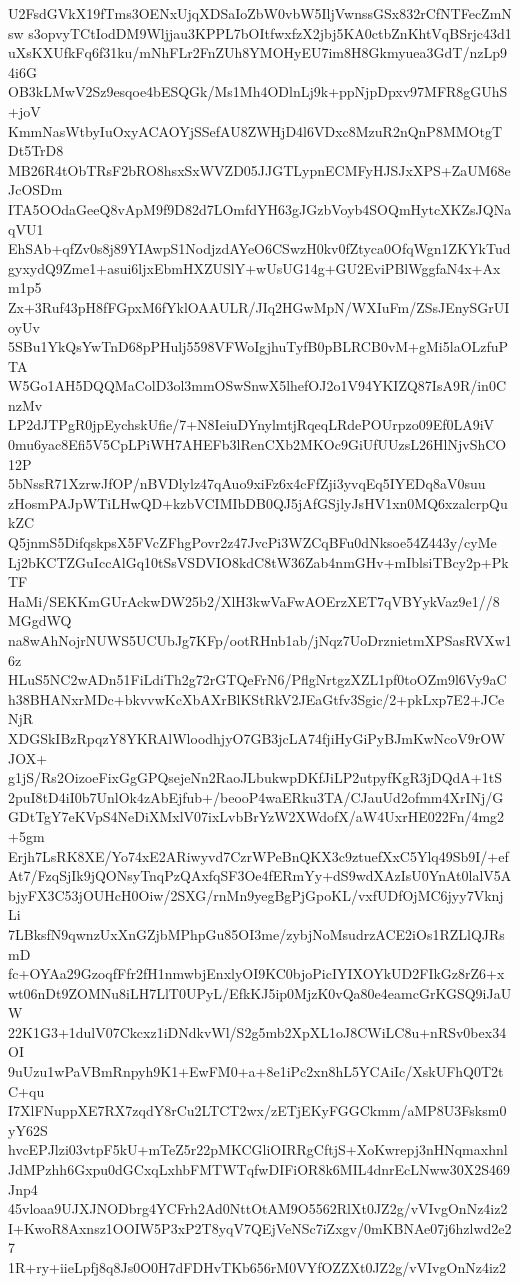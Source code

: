 U2FsdGVkX19fTms3OENxUjqXDSaIoZbW0vbW5IljVwnssGSx832rCfNTFecZmNsw
s3opvyTCtIodDM9Wljjau3KPPL7bOItfwxfzX2jbj5KA0ctbZnKhtVqBSrjc43d1
uXsKXUfkFq6f31ku/mNhFLr2FnZUh8YMOHyEU7im8H8Gkmyuea3GdT/nzLp94i6G
OB3kLMwV2Sz9esqoe4bESQGk/Ms1Mh4ODlnLj9k+ppNjpDpxv97MFR8gGUhS+joV
KmmNasWtbyIuOxyACAOYjSSefAU8ZWHjD4l6VDxc8MzuR2nQnP8MMOtgTDt5TrD8
MB26R4tObTRsF2bRO8hsxSxWVZD05JJGTLypnECMFyHJSJxXPS+ZaUM68eJcOSDm
ITA5OOdaGeeQ8vApM9f9D82d7LOmfdYH63gJGzbVoyb4SOQmHytcXKZsJQNaqVU1
EhSAb+qfZv0s8j89YIAwpS1NodjzdAYeO6CSwzH0kv0fZtyca0OfqWgn1ZKYkTud
gyxydQ9Zme1+asui6ljxEbmHXZUSlY+wUsUG14g+GU2EviPBlWggfaN4x+Axm1p5
Zx+3Ruf43pH8fFGpxM6fYklOAAULR/JIq2HGwMpN/WXIuFm/ZSsJEnySGrUIoyUv
5SBu1YkQsYwTnD68pPHulj5598VFWoIgjhuTyfB0pBLRCB0vM+gMi5laOLzfuPTA
W5Go1AH5DQQMaColD3ol3mmOSwSnwX5lhefOJ2o1V94YKIZQ87IsA9R/in0CnzMv
LP2dJTPgR0jpEychskUfie/7+N8IeiuDYnylmtjRqeqLRdePOUrpzo09Ef0LA9iV
0mu6yac8Efi5V5CpLPiWH7AHEFb3lRenCXb2MKOc9GiUfUUzsL26HlNjvShCO12P
5bNssR71XzrwJfOP/nBVDlylz47qAuo9xiFz6x4cFfZji3yvqEq5IYEDq8aV0suu
zHosmPAJpWTiLHwQD+kzbVCIMIbDB0QJ5jAfGSjlyJsHV1xn0MQ6xzalcrpQukZC
Q5jnmS5DifqskpsX5FVcZFhgPovr2z47JvcPi3WZCqBFu0dNksoe54Z443y/cyMe
Lj2bKCTZGuIccAlGq10tSsVSDVIO8kdC8tW36Zab4nmGHv+mIblsiTBcy2p+PkTF
HaMi/SEKKmGUrAckwDW25b2/XlH3kwVaFwAOErzXET7qVBYykVaz9e1//8MGgdWQ
na8wAhNojrNUWS5UCUbJg7KFp/ootRHnb1ab/jNqz7UoDrznietmXPSasRVXw16z
HLuS5NC2wADn51FiLdiTh2g72rGTQeFrN6/PflgNrtgzXZL1pf0toOZm9l6Vy9aC
h38BHANxrMDc+bkvvwKcXbAXrBlKStRkV2JEaGtfv3Sgic/2+pkLxp7E2+JCeNjR
XDGSkIBzRpqzY8YKRAlWloodhjyO7GB3jcLA74fjiHyGiPyBJmKwNcoV9rOWJOX+
g1jS/Rs2OizoeFixGgGPQsejeNn2RaoJLbukwpDKfJiLP2utpyfKgR3jDQdA+1tS
2puI8tD4iI0b7UnlOk4zAbEjfub+/beooP4waERku3TA/CJauUd2ofmm4XrINj/G
GDtTgY7eKVpS4NeDiXMxlV07ixLvbBrYzW2XWdofX/aW4UxrHE022Fn/4mg2+5gm
Erjh7LsRK8XE/Yo74xE2ARiwyvd7CzrWPeBnQKX3c9ztuefXxC5Ylq49Sb9I/+ef
At7/FzqSjIk9jQONsyTnqPzQAxfqSF3Oe4fERmYy+dS9wdXAzIsU0YnAt0lalV5A
bjyFX3C53jOUHcH0Oiw/2SXG/rnMn9yegBgPjGpoKL/vxfUDfOjMC6jyy7VknjLi
7LBksfN9qwnzUxXnGZjbMPhpGu85OI3me/zybjNoMsudrzACE2iOs1RZLlQJRsmD
fc+OYAa29GzoqfFfr2fH1nmwbjEnxlyOI9KC0bjoPicIYIXOYkUD2FIkGz8rZ6+x
wt06nDt9ZOMNu8iLH7LlT0UPyL/EfkKJ5ip0MjzK0vQa80e4eamcGrKGSQ9iJaUW
22K1G3+1dulV07Ckcxz1iDNdkvWl/S2g5mb2XpXL1oJ8CWiLC8u+nRSv0bex34OI
9uUzu1wPaVBmRnpyh9K1+EwFM0+a+8e1iPc2xn8hL5YCAiIc/XskUFhQ0T2tC+qu
I7XlFNuppXE7RX7zqdY8rCu2LTCT2wx/zETjEKyFGGCkmm/aMP8U3Fsksm0yY62S
hvcEPJlzi03vtpF5kU+mTeZ5r22pMKCGliOIRRgCftjS+XoKwrepj3nHNqmaxhnl
JdMPzhh6Gxpu0dGCxqLxhbFMTWTqfwDIFiOR8k6MIL4dnrEcLNww30X2S469Jnp4
45vloaa9UJXJNODbrg4YCFrh2Ad0NttOtAM9O5562RlXt0JZ2g/vVIvgOnNz4iz2
I+KwoR8Axnsz1OOIW5P3xP2T8yqV7QEjVeNSc7iZxgv/0mKBNAe07j6hzlwd2e27
1R+ry+iieLpfj8q8Js0O0H7dFDHvTKb656rM0VYfOZZXt0JZ2g/vVIvgOnNz4iz2
